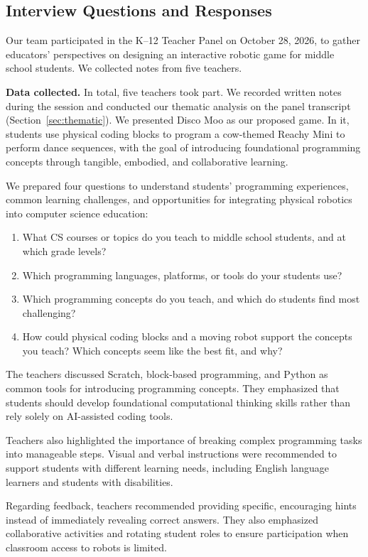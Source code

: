 \documentclass[conference]{IEEEtran}
\begin{document}
\subsection{Interview Questions and Responses}

Our team participated in the K--12 Teacher Panel on October 28, 2026, to gather educators' perspectives on designing an interactive robotic game for middle school students. We collected notes from five teachers.

\textbf{Data collected.} In total, five teachers took part. We recorded written notes during the session and conducted our thematic analysis on the panel transcript (Section~\ref{sec:thematic}). We presented Disco Moo as our proposed game. In it, students use physical coding blocks to program a cow-themed Reachy Mini to perform dance sequences, with the goal of introducing foundational programming concepts through tangible, embodied, and collaborative learning.

We prepared four questions to understand students' programming experiences, common learning challenges, and opportunities for integrating physical robotics into computer science education:

\begin{enumerate}
    \item What CS courses or topics do you teach to middle school students, and at which grade levels?
    \item Which programming languages, platforms, or tools do your students use?
    \item Which programming concepts do you teach, and which do students find most challenging?
    \item How could physical coding blocks and a moving robot support the concepts you teach? Which concepts seem like the best fit, and why?
\end{enumerate}

The teachers discussed Scratch, block-based programming, and Python as common tools for introducing programming concepts. They emphasized that students should develop foundational computational thinking skills rather than rely solely on AI-assisted coding tools.

Teachers also highlighted the importance of breaking complex programming tasks into manageable steps. Visual and verbal instructions were recommended to support students with different learning needs, including English language learners and students with disabilities.

Regarding feedback, teachers recommended providing specific, encouraging hints instead of immediately revealing correct answers. They also emphasized collaborative activities and rotating student roles to ensure participation when classroom access to robots is limited.
\end{document}
